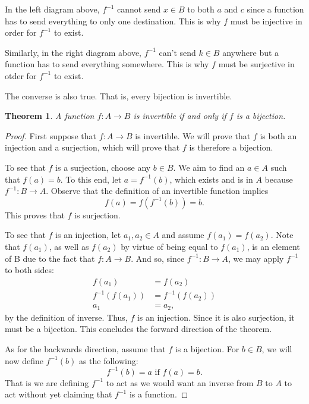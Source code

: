 \documentclass{amsart}
\newtheorem{thrm}{Theorem}
\theoremstyle{definition}
\theoremstyle{definition}
\theoremstyle{remark}
\begin{document}
\bigskip
In the left diagram above, $f^{-1}$ cannot send $x\in B$ to both $a$ and $c$ since a function has to send everything to only one destination. This is why $f$ must be injective in order for $f^{-1}$ to exist.


Similarly, in the right diagram above, $f^{-1}$ can't send $k\in B$ anywhere but a function has to send everything somewhere. This is why $f$ must be surjective in otder for $f^{-1}$ to exist.


The converse is also true. That is, every bijection is invertible.

\begin{thrm}
      A function $f:A\rightarrow B$ is invertible if and only if $f$ is a bijection.
\end{thrm}

\begin{proof}
      First suppose that $f:A\rightarrow B$ is invertible. We will prove that $f$ is both an injection and a surjection, which will prove that $f$ is therefore a bijection.


      To see that $f$ is a surjection, choose any $b\in B$. We aim to find an $a\in A$ such that $f(a)=b$. To this end, let $a=f^{-1}(b)$, which exists and is in $A$ because $f^{-1}:B\rightarrow A$. Observe that the definition of an invertible function implies
      \[f(a) = f(f^{-1}(b)) = b. \]
      This proves that $f$ is surjection.


      To see that $f$ is an injection, let $a_1,a_2\in A$ and assume $f(a_1)=f(a_2)$. Note that $f(a_1)$, as well as $f(a_2)$ by virtue of being equal to $f(a_1)$, is an element of B due to the fact that $f:A\rightarrow B$. And so, since $f^{-1}:B\rightarrow A$, we may apply $f^{-1}$ to both sides:
      \begin{align*}
            f(a_1)&=f(a_2) \\
            f^{-1}(f(a_1))&=f^{-1}(f(a_2)) \\
            a_1&=a_2,
      \end{align*}
      by the definition of inverse. Thus, $f$ is an injection. Since it is also surjection, it must be a bijection. This concludes the forward direction of the theorem.

      \bigskip
      As for the backwards direction, assume that $f$ is a bijection. For $b\in B$, we will now define $f^{-1}(b)$ as the following:
      \[f^{-1}(b)=a \text{ if } f(a)=b.\]
      That is we are defining $f^{-1}$ to act as we would want an inverse from $B$ to $A$ to act without yet claiming that $f^{-1}$ is a function.



\end{proof}
\end{document}
